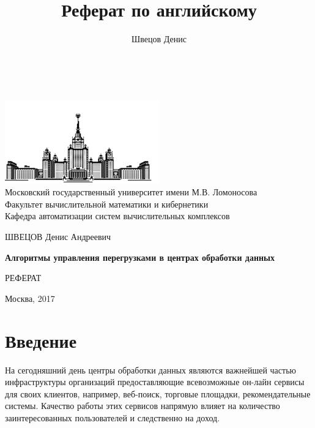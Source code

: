 \documentclass[14pt, a4paper,oneside]{extarticle}
\author{Швецов Денис}
\title{Реферат по английскому}
\begin{document}
\thispagestyle{empty}

	\thispagestyle{empty}
	
	\begin{center}
		\ \vspace{-0.5cm}
		
		\includegraphics[width=0.5\textwidth]{msu}\\
		{Московский государственный университет имени М.В. Ломоносова}\\
		Факультет вычислительной математики и кибернетики\\
		Кафедра автоматизации систем вычислительных комплексов
		
		\vspace{2.5cm}
		
		{\Large ШВЕЦОВ Денис Андреевич}
		
		\vspace{1cm}
		
		{\Large\bfseries
			Алгоритмы управления перегрузками в центрах обработки данных\\}
		
		\vspace{2cm}
		
		{\large РЕФЕРАТ}
	\end{center}
	\vfill
	\begin{center}
		Москва, 2017
	\end{center}
	\vspace{1cm}
	\enlargethispage{4\baselineskip}

\newpage
	\tableofcontents
\newpage
\section{Введение}

На сегодняшний день центры обработки данных являются важнейшей частью инфраструктуры организаций предоставляющие всевозможные он-лайн сервисы для своих клиентов, например, веб-поиск, торговые площадки, рекомендательные системы. Качество работы этих сервисов напрямую влияет на количество заинтересованных пользователей и следственно на доход. 
\end{document}
